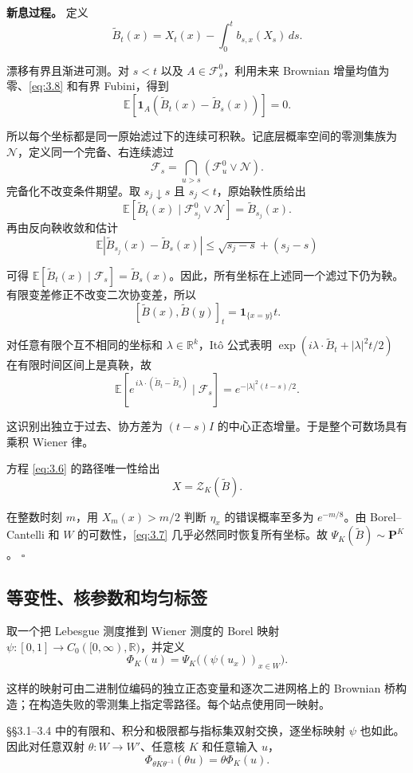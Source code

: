 \documentclass[UTF8,zihao=-4,a4paper]{ctexart}
\numberwithin{equation}{section}
\begin{document}
\textbf{新息过程。} 定义
\[
\widetilde B_t(x)=X_t(x)-\int_0^t b_{s,x}(X_s)\,ds.
\]

漂移有界且渐进可测。对 \(s<t\) 以及 \(A\in\mathcal F_s^0\)，利用未来 Brownian 增量均值为零、\eqref{eq:3.8} 和有界 Fubini，得到
\[
\mathbb E[\mathbf1_A(\widetilde B_t(x)-\widetilde B_s(x))]=0.
\]

所以每个坐标都是同一原始滤过下的连续可积鞅。记底层概率空间的零测集族为 \(\mathcal N\)，定义同一个完备、右连续滤过
\[
 \mathcal F_s=\bigcap_{u>s}(\mathcal F_u^0\vee\mathcal N).
\]
完备化不改变条件期望。取 \(s_j\downarrow s\) 且 \(s_j<t\)，原始鞅性质给出
\[
 \mathbb E[\widetilde B_t(x)\mid\mathcal F_{s_j}^0\vee\mathcal N]
 =\widetilde B_{s_j}(x).
\]
再由反向鞅收敛和估计
\[
\mathbb E|\widetilde B_{s_j}(x)-\widetilde B_s(x)|
\le\sqrt{s_j-s}+(s_j-s)
\]

可得 \(\mathbb E[\widetilde B_t(x)\mid\mathcal F_s]=\widetilde B_s(x)\)。因此，所有坐标在上述同一个滤过下仍为鞅。有限变差修正不改变二次协变差，所以
\[
[\widetilde B(x),\widetilde B(y)]_t=\mathbf1_{\{x=y\}}t.
\]

对任意有限个互不相同的坐标和 \(\lambda\in\mathbb R^k\)，Itô 公式表明
\(\exp(i\lambda\cdot\widetilde B_t+|\lambda|^2t/2)\) 在有限时间区间上是真鞅，故
\[
\mathbb E\!\left[
e^{\,i\lambda\cdot(\widetilde B_t-\widetilde B_s)}
\mid\mathcal F_s\right]
=e^{-|\lambda|^2(t-s)/2}.
\]

这识别出独立于过去、协方差为 \((t-s)I\) 的中心正态增量。于是整个可数场具有乘积 Wiener 律。

方程 \eqref{eq:3.6} 的路径唯一性给出
\[
X=\mathcal Z_K(\widetilde B).
\]

在整数时刻 \(m\)，用 \(X_m(x)>m/2\) 判断 \(\eta_x\) 的错误概率至多为 \(e^{-m/8}\)。由 Borel--Cantelli 和 \(W\) 的可数性，\eqref{eq:3.7} 几乎必然同时恢复所有坐标。故 \(\Psi_K(\widetilde B)\sim\mathbf P^K\)。 \(\square\)

\subsection{等变性、核参数和均匀标签}

取一个把 Lebesgue 测度推到 Wiener 测度的 Borel 映射
\(\psi:[0,1]\to C_0([0,\infty),\mathbb R)\)，并定义
\[
\Phi_K(u)=\Psi_K\bigl((\psi(u_x))_{x\in W}\bigr).
\]

这样的映射可由二进制位编码的独立正态变量和逐次二进网格上的 Brownian 桥构造；在构造失败的零测集上指定零路径。每个站点使用同一映射。

\S{}\S{}3.1--3.4 中的有限和、积分和极限都与指标集双射交换，逐坐标映射 \(\psi\) 也如此。因此对任意双射 \(\theta:W\to W'\)、任意核 \(K\) 和任意输入 \(u\)，
\[
\Phi_{\theta K\theta^{-1}}(\theta u)
=\theta\Phi_K(u).
\tag{3.9}\label{eq:3.9}
\]
\end{document}
